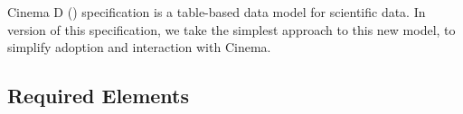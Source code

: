 Cinema D (\dietrich) specification is a table-based data model for scientific data. In version \version of this specification, we take the simplest approach to
this new model, to simplify adoption and interaction with Cinema.

\subsection{Required Elements}

